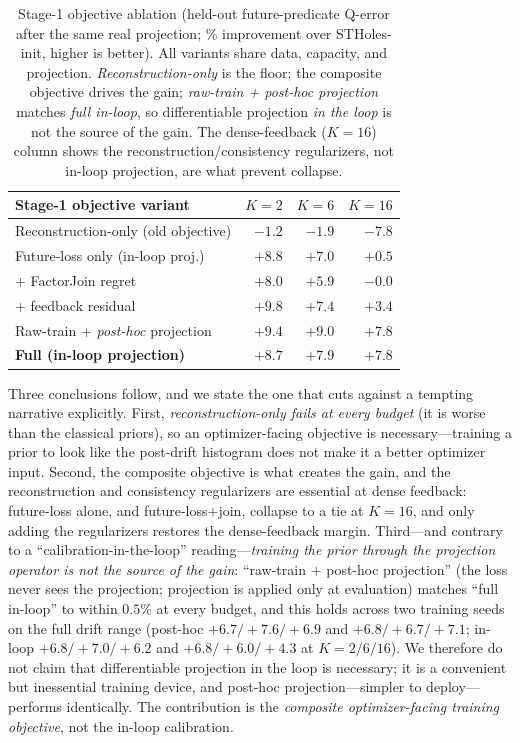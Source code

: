\begin{table}[t]
  \centering\small
  \caption{Stage-1 objective ablation (held-out future-predicate Q-error after the
  same real projection; \% improvement over STHoles-init, higher is better). All
  variants share data, capacity, and projection. \emph{Reconstruction-only} is the
  floor; the composite objective drives the gain; \emph{raw-train + post-hoc
  projection} matches \emph{full in-loop}, so differentiable projection
  \emph{in the loop} is not the source of the gain. The dense-feedback ($K{=}16$)
  column shows the reconstruction/consistency regularizers, not in-loop
  projection, are what prevent collapse.}
  \label{tab:mr_ablation}
  \setlength{\tabcolsep}{6pt}
  \begin{tabular}{l rrr}
    \toprule
    Stage-1 objective variant & $K{=}2$ & $K{=}6$ & $K{=}16$ \\
    \midrule
    Reconstruction-only (old objective) & $-1.2$ & $-1.9$ & $-7.8$ \\
    Future-loss only (in-loop proj.)    & $+8.8$ & $+7.0$ & $+0.5$ \\
    \;\;+ FactorJoin regret             & $+8.0$ & $+5.9$ & $-0.0$ \\
    \;\;+ feedback residual             & $+9.8$ & $+7.4$ & $+3.4$ \\
    Raw-train + \emph{post-hoc} projection & $+9.4$ & $+9.0$ & $+7.8$ \\
    \textbf{Full (in-loop projection)}  & $+8.7$ & $+7.9$ & $+7.8$ \\
    \bottomrule
  \end{tabular}
\end{table}

Three conclusions follow, and we state the one that cuts against a tempting
narrative explicitly. First, \emph{reconstruction-only fails at every budget}
(it is worse than the classical priors), so an optimizer-facing objective is
necessary---training a prior to look like the post-drift histogram does not make
it a better optimizer input. Second, the composite objective is what creates the
gain, and the reconstruction and consistency regularizers are essential at dense
feedback: future-loss alone, and future-loss${+}$join, collapse to a tie at
$K{=}16$, and only adding the regularizers restores the dense-feedback margin.
Third---and contrary to a ``calibration-in-the-loop'' reading---\emph{training
the prior through the projection operator is not the source of the gain}:
``raw-train ${+}$ post-hoc projection'' (the loss never sees the projection;
projection is applied only at evaluation) matches ``full in-loop'' to within
$0.5\%$ at every budget, and this holds across two training seeds on the full
drift range (post-hoc $+6.7/+7.6/+6.9$ and $+6.8/+6.7/+7.1$; in-loop
$+6.8/+7.0/+6.2$ and $+6.8/+6.0/+4.3$ at $K{=}2/6/16$). We therefore do not claim
that differentiable projection in the loop is necessary; it is a convenient but
inessential training device, and post-hoc projection---simpler to
deploy---performs identically. The contribution is the \emph{composite
optimizer-facing training objective}, not the in-loop calibration.

